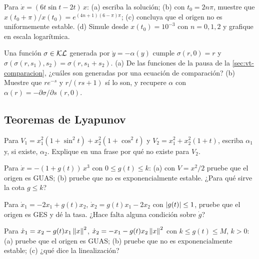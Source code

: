 \begin{problema}\label{prob:vt-6tsin}
\etiquetaM{} Para $\dot x=(6t\sin t-2t)\,x$: (a) escriba la solución; (b) con $t_0=2n\pi$, muestre que $x(t_0+\pi)/x(t_0)=e^{(4n+1)(6-\pi)\pi}$; (c) concluya que el origen no es uniformemente estable. (d) Simule desde $x(t_0)=10^{-3}$ con $n=0,1,2$ y grafique en escala logarítmica.
\end{problema}

\begin{problema}\label{prob:vt-flujo}
Una función $\sigma\in\mathcal{KL}$ generada por $\dot y=-\alpha(y)$ cumple $\sigma(r,0)=r$ y $\sigma(\sigma(r,s_1),s_2)=\sigma(r,s_1+s_2)$. (a) De las funciones de la pausa de la \cref{sec:vt-comparacion}, ¿cuáles son generadas por una ecuación de comparación? (b) Muestre que $re^{-s}$ y $r/(rs+1)$ sí lo son, y recupere $\alpha$ con $\alpha(r)=-\partial\sigma/\partial s\,(r,0)$.
\end{problema}

\subsection*{Teoremas de Lyapunov}

\begin{problema}\label{prob:vt-decreciente}
Para $V_1=x_1^2(1+\sin^2t)+x_2^2(1+\cos^2t)$ y $V_2=x_1^2+x_2^2(1+t)$, escriba $\alpha_1$ y, si existe, $\alpha_2$. Explique en una frase por qué no existe para $V_2$.
\end{problema}

\begin{problema}\label{prob:vt-cubico}
Para $\dot x=-(1+g(t))\,x^3$ con $0\le g(t)\le k$: (a) con $V=x^2/2$ pruebe que el origen es GUAS; (b) pruebe que no es exponencialmente estable. ¿Para qué sirve la cota $g\le k$?
\end{problema}

\begin{problema}\label{prob:vt-seron2}
Para $\dot x_1=-2x_1+g(t)x_2$, $\dot x_2=g(t)x_1-2x_2$ con $\left\lvert g(t)\right\rvert\le1$, pruebe que el origen es GES y dé la tasa. ¿Hace falta alguna condición sobre $\dot g$?
\end{problema}

\begin{problema}\label{prob:vt-seron3}
Para $\dot x_1=x_2-g(t)x_1\left\lVert x\right\rVert^2$, $\dot x_2=-x_1-g(t)x_2\left\lVert x\right\rVert^2$ con $k\le g(t)\le M$, $k>0$: (a) pruebe que el origen es GUAS; (b) pruebe que no es exponencialmente estable; (c) ¿qué dice la linealización?
\end{problema}

